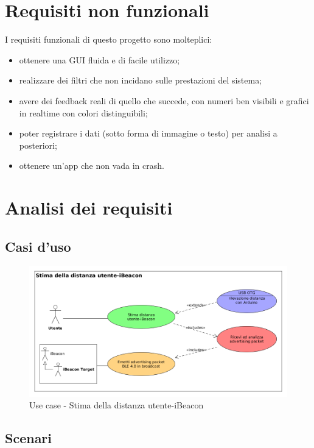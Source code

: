 \section{Requisiti non funzionali}
I requisiti funzionali di questo progetto sono molteplici:
\begin{itemize}
	\item ottenere una GUI fluida e di facile utilizzo;
	
	\item realizzare dei filtri che non incidano sulle prestazioni del sistema;
	
	\item avere dei feedback reali di quello che succede, con numeri ben visibili e grafici in realtime con colori distinguibili;
	
	\item poter registrare i dati (sotto forma di immagine o testo) per analisi a posteriori;
	
	\item ottenere un'app che non vada in crash.
\end{itemize}

\section{Analisi dei requisiti}
\subsection{Casi d'uso}
\begin{figure}[ph]
	\centering
	\includegraphics[scale=.45]{img/uml/use_case/use_case1}
	\caption[Use case - Stima della distanza utente-iBeacon]{Use case - Stima della distanza utente-iBeacon}
	\label{fig:usecase}
\end{figure}

\subsection{Scenari}

